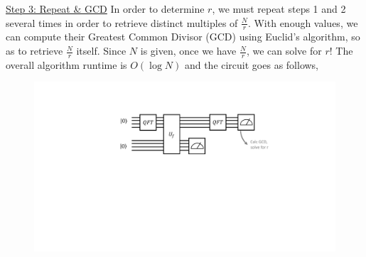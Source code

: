 \documentclass[11pt]{article} %
\begin{document}
\newline\newline
\underline{Step 3: Repeat \& GCD}
\newline\newline
In order to determine $r$, we must repeat steps 1 and 2 several times in order to retrieve distinct multiples of $\frac{N}{r}$. With enough values, we can compute their Greatest Common Divisor (GCD) using Euclid's algorithm, so as to retrieve $\frac{N}{r}$ itself. Since $N$ is given, once we have $\frac{N}{r}$, we can solve for $r$! 
\newline\newline
The overall algorithm runtime is $O(\log N)$ and the circuit goes as follows,
\begin{figure}
    \centering
    \includegraphics[width=.7\textwidth]{Lecture7Figs/periodfind.pdf}
\end{figure}
\end{document}
